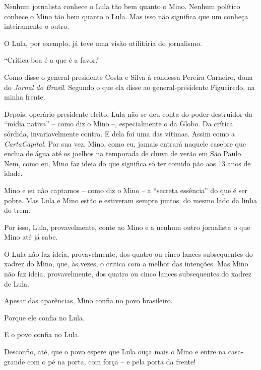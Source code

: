 


Nenhum jornalista conhece o Lula tão bem quanto o Mino. Nenhum político conhece
o Mino tão bem quanto o Lula. Mas isso não significa que um conheça
inteiramente o outro.

O Lula, por exemplo, já teve uma visão utilitária do jornalismo.

“Crítica boa é a que é a favor.”

Como disse o general-presidente Costa e Silva à condessa Pereira Carneiro, dona
do \emph{Jornal do Brasil}.  Segundo o que ela disse ao general-presidente Figueiredo,
na minha frente.

Depois, operário-presidente eleito, Lula não se deu conta do poder destruidor
da “mídia nativa” – como diz o Mino –, especialmente o da Globo.  Da crítica
sórdida, invariavelmente contra. E dela foi uma das vítimas. Assim como a
\emph{CartaCapital}. Por sua vez, Mino, como eu, jamais entrará naquele casebre que
enchia de água até os joelhos na temporada de chuva de verão em São Paulo. Nem,
como eu, Mino faz ideia do que significa só ter comido pão aos 13 anos de
idade.

Mino e eu não captamos – como diz o Mino – a “secreta essência” do que é ser
pobre. Mas Lula e Mino estão e estiveram sempre juntos, do mesmo lado da linha
do trem.

Por isso, Lula, provavelmente, conte ao Mino e a nenhum outro jornalista o que
Mino até já sabe.

O Lula não faz ideia, provavelmente, dos quatro ou cinco lances subsequentes do
xadrez do Mino, que, às vezes, o critica com a melhor das intenções. Mas Mino
não faz ideia, provavelmente, dos quatro ou cinco lances subsequentes do xadrez
de Lula.

Apesar das aparências, Mino confia no povo brasileiro.

Porque ele confia no Lula.

E o povo confia no Lula.

Desconfio, até, que o povo espere que Lula ouça mais o Mino e entre na
casa-grande com o pé na porta, com força – e pela porta da frente!



